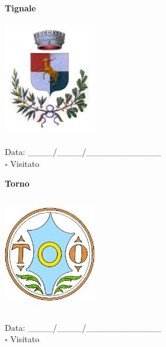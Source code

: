\documentclass[a5paper,12pt]{article}
\begin{document}
\newpage

\noindent
\begin{minipage}[t]{0.45\textwidth}
    \begin{center}
        \textbf{Tignale}
    \end{center}
    \vspace{-0.5cm} %
    \begin{center}
        \includegraphics[height= 5cm, width=4cm]{Lombardia/Stemma Tignale.png}
    \end{center}
    \vspace{-0.4cm} %
    \begin{flushleft}
        Data: \_\_\_\_/\_\_\_\_/\_\_\_\_\_\_\_\_\_\_\_\_ \\
        $\square$ Visitato
    \end{flushleft}
\end{minipage}
\hfill
\noindent
\begin{minipage}[t]{0.45\textwidth}
    \begin{center}
        \textbf{Torno}
    \end{center}
    \vspace{-0.5cm} %
    \begin{center}
        \includegraphics[height= 5cm, width=4cm]{Lombardia/Stemma Torno.png}
    \end{center}
    \vspace{-0.4cm} %
    \begin{flushleft}
        Data: \_\_\_\_/\_\_\_\_/\_\_\_\_\_\_\_\_\_\_\_\_ \\
        $\square$ Visitato
    \end{flushleft}
\end{minipage}
\end{document}
